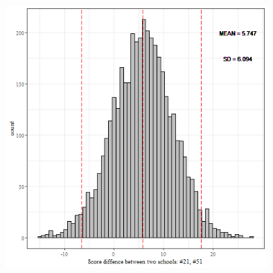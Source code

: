 \begin{figure}
	\centering
	\includegraphics[width=10cm,height=10cm,keepaspectratio]{graphics/differences.png}
	\caption{}
	\label{fig:differences}
\end{figure}

